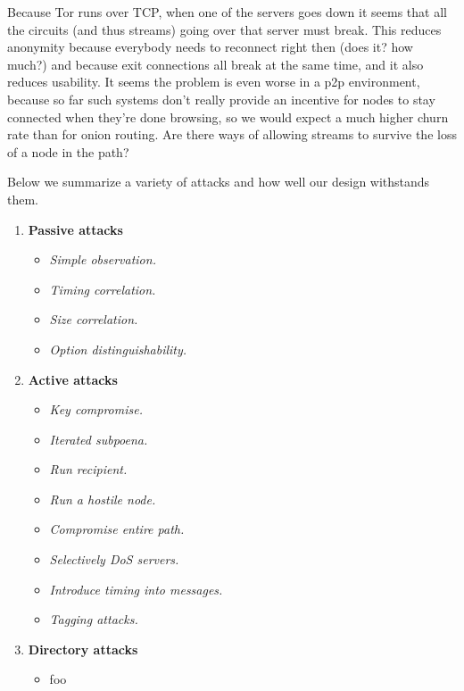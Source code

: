 \documentclass[times,10pt,twocolumn]{article}
\begin{document}
Because Tor runs over TCP, when one of the servers goes down it seems
that all the circuits (and thus streams) going over that server must
break. This reduces anonymity because everybody needs to reconnect
right then (does it? how much?) and because exit connections all break
at the same time, and it also reduces usability. It seems the problem
is even worse in a p2p environment, because so far such systems don't
really provide an incentive for nodes to stay connected when they're
done browsing, so we would expect a much higher churn rate than for
onion routing. Are there ways of allowing streams to survive the loss
of a node in the path?



\label{sec:attacks}

Below we summarize a variety of attacks and how well our design withstands
them.

\begin{enumerate}
\item \textbf{Passive attacks}
\begin{itemize}
\item \emph{Simple observation.}
\item \emph{Timing correlation.}
\item \emph{Size correlation.}
\item \emph{Option distinguishability.}
\end{itemize}

\item \textbf{Active attacks}
\begin{itemize}
\item \emph{Key compromise.}
\item \emph{Iterated subpoena.}
\item \emph{Run recipient.}
\item \emph{Run a hostile node.}
\item \emph{Compromise entire path.}
\item \emph{Selectively DoS servers.}
\item \emph{Introduce timing into messages.}
\item \emph{Tagging attacks.}
\end{itemize}

\item \textbf{Directory attacks}
\begin{itemize}
\item foo
\end{itemize}

\end{enumerate}
\end{document}
